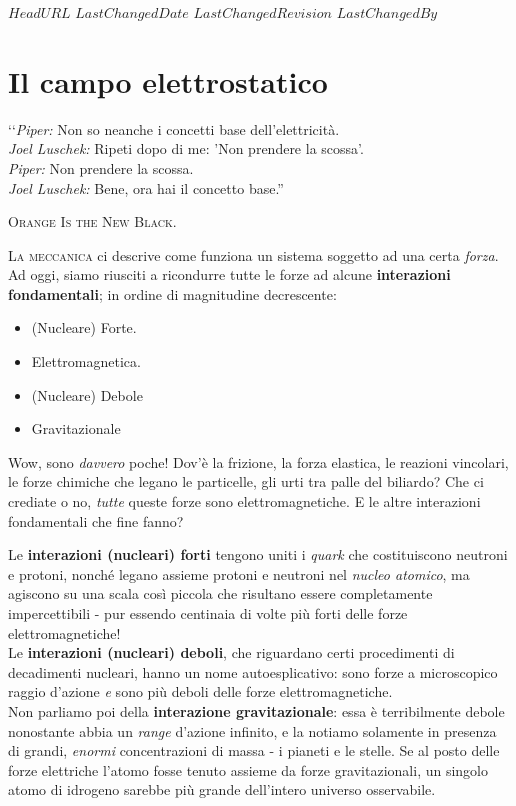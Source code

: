 \svnidlong
{$HeadURL$}
{$LastChangedDate$}
{$LastChangedRevision$}
{$LastChangedBy$}

\chapter{Il campo elettrostatico}

\begin{introduction}
	‘‘\emph{Piper:} Non so neanche i concetti base dell'elettricità.\\
	\emph{Joel Luschek:} Ripeti dopo di me: 'Non prendere la scossa'.\\
	\emph{Piper:} Non prendere la scossa.\\
	\emph{Joel Luschek:} Bene, ora hai il concetto base.''
\begin{flushright}
	\textsc{Orange Is the New Black}.
\end{flushright}
\end{introduction}
\lettrine[findent=1pt, nindent=0pt]{L}{a meccanica} ci descrive come funziona un sistema soggetto ad una certa \textit{forza}. Ad oggi, siamo riusciti a ricondurre tutte le forze ad alcune \textbf{interazioni fondamentali}; in ordine di magnitudine decrescente:
 \begin{itemize}
 	\item (Nucleare) Forte.
 	\item Elettromagnetica.
 	\item (Nucleare) Debole
 	\item Gravitazionale
 \end{itemize}
 Wow, sono \textit{davvero} poche! Dov'è la frizione, la forza elastica, le reazioni vincolari, le forze chimiche che legano le particelle, gli urti tra palle del biliardo? Che ci crediate o no, \textit{tutte} queste forze sono elettromagnetiche. E le altre interazioni fondamentali che fine fanno?

Le \textbf{interazioni (nucleari) forti} tengono uniti i \textit{quark} che costituiscono neutroni e protoni, nonché legano assieme protoni e neutroni nel \textit{nucleo atomico}, ma agiscono su una scala così piccola che risultano essere completamente impercettibili - pur essendo centinaia di volte più forti delle forze elettromagnetiche!\\
Le \textbf{interazioni (nucleari) deboli}, che riguardano certi procedimenti di decadimenti nucleari, hanno un nome autoesplicativo: sono forze a microscopico raggio d'azione \textit{e} sono più deboli delle forze elettromagnetiche.\\
Non parliamo poi della \textbf{interazione gravitazionale}: essa è terribilmente debole nonostante abbia un \textit{range} d'azione infinito, e la notiamo solamente in presenza di grandi, \textit{enormi} concentrazioni di massa - i pianeti e le stelle. Se al posto delle forze elettriche l'atomo fosse tenuto assieme da forze gravitazionali, un singolo atomo di idrogeno sarebbe più grande dell'intero universo osservabile.

